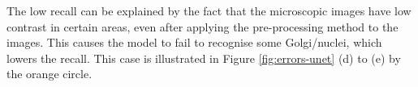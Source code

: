 The low recall can be explained by the fact that the microscopic images have low contrast in certain areas, even after applying the pre-processing method to the images. This causes the model to fail to recognise some Golgi/nuclei, which lowers the recall. This case is illustrated in Figure \ref{fig:errors-unet} (d) to (e) by the orange circle.

\begin{figure}[!htb]

\centering
{}\hfil
{}\hfil 
{} 


\end{figure}
